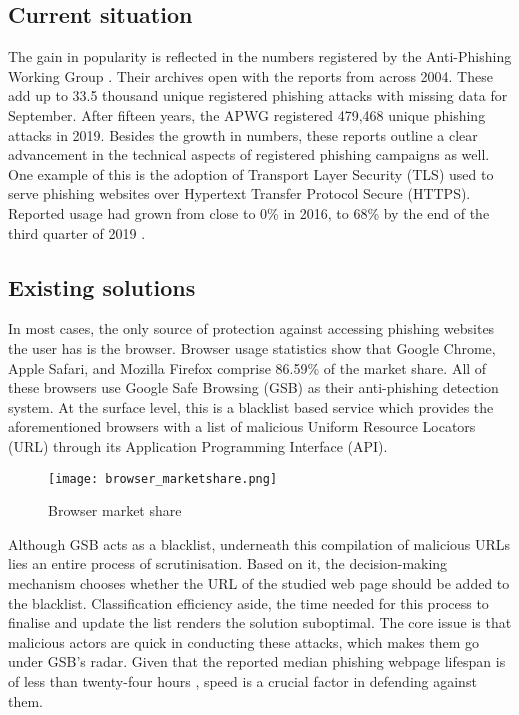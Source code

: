 \subsection{Current situation}
\label{subsec:current_situation}
The gain in popularity is reflected in the numbers registered by the Anti-Phishing Working Group \citep{APWG}. Their archives open with the reports from across 2004. These add up to 33.5 thousand unique registered phishing attacks with missing data for September. After fifteen years, the APWG registered 479,468 unique phishing attacks in 2019. Besides the growth in numbers, these reports outline a clear advancement in the technical aspects of registered phishing campaigns as well. One example of this is the adoption of Transport Layer Security (TLS) used to serve phishing websites over Hypertext Transfer Protocol Secure (HTTPS). Reported usage had grown from close to 0\% in 2016, to 68\% by the end of the third quarter of 2019 \citep{APWG_Q42019}.

\subsection{Existing solutions}
\label{subsec:existing_solutions}
In most cases, the only source of protection against accessing phishing websites
the user has is the browser. Browser usage statistics show that Google
Chrome, Apple Safari, and Mozilla Firefox comprise 86.59\% \citep{Statcounter} of the market share. All of these browsers use Google Safe Browsing (GSB) as their anti-phishing detection system. At the surface level, this is a blacklist based service which provides the aforementioned browsers with a list of malicious Uniform Resource Locators (URL) through its
Application Programming Interface (API).

\begin{figure}[t]
	\centering
	\texttt{[image: browser\_marketshare.png]}
	\caption{Browser market share \citep{Statcounter}}
	\label{fig:BROWSER_MARKETSHARE}
\end{figure}

Although GSB acts as a blacklist, underneath this compilation of malicious URLs lies an entire process of scrutinisation. Based on it, the decision-making mechanism chooses whether the URL of the studied web page should be added to the blacklist. Classification efficiency aside, the time needed for this process to finalise and update the list renders the solution suboptimal. The core issue is that malicious actors are quick in conducting these attacks, which makes them go under GSB's radar. Given that the reported median phishing webpage lifespan is of less than twenty-four hours \citep{Kelly_Sheridan}, speed is a crucial factor in defending against them.

